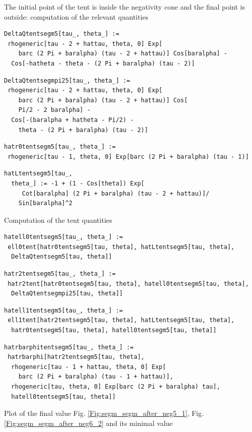 \documentclass[reqno]{amsart}
\theoremstyle{definition} \newtheorem{definition}{Definition}[section]
\theoremstyle{definition} \newtheorem{remark}[definition]{Remark}
\theoremstyle{plain} \newtheorem{lemma}[definition]{Lemma}
\theoremstyle{plain} \newtheorem{proposition}[definition]{Proposition}
\theoremstyle{plain} \newtheorem{theorem}[definition]{Theorem}
\theoremstyle{plain} \newtheorem{corollary}[definition]{Corollary}
\theoremstyle{definition} \newtheorem{example}[definition]{Example}
\theoremstyle{plain} \newtheorem{claim}[clai]{Claim}
\theoremstyle{definition} \newtheorem{assumption}[definition]{Assumption}
\theoremstyle{definition} \newtheorem{observation}[definition]{Observation}
\newcommand{\1}{\mathbbm 1}
\newcommand{\smed}{\medskip}
\numberwithin{equation}{section} %
\theoremstyle{plain} \newtheorem*{theorem*}{Theorem}
\theoremstyle{plain} \newtheorem{mthm}[maintheorem]{Main Theorem}
\theoremstyle{plain} \newtheorem*{mthm*}{Main Theorem}
\theoremstyle{plain} \newtheorem*{conjecture*}{Conjecture}
\theoremstyle{plain} \newtheorem{conjecture}[definition]{Conjecture}
\theoremstyle{plain} \newtheorem*{problem*}{Problem}
\begin{document}
\noindent The initial point of the tent is inside the negativity cone and the final point is outside: computation of the relevant quantities
\smed
\begin{verbatim}
DeltaQtentsegm5[tau_, theta_] := 
 rhogeneric[tau - 2 + hattau, theta, 0] Exp[
    barc (2 Pi + baralpha) (tau - 2 + hattau)] Cos[baralpha] - 
  Cos[-hatheta - theta - (2 Pi + baralpha) (tau - 2)]
\end{verbatim}
\begin{verbatim}
DeltaQtentsegmpi25[tau_, theta_] := 
 rhogeneric[tau - 2 + hattau, theta, 0] Exp[
    barc (2 Pi + baralpha) (tau - 2 + hattau)] Cos[
    Pi/2 - 2 baralpha] - 
  Cos[-(baralpha + hatheta - Pi/2) - 
    theta - (2 Pi + baralpha) (tau - 2)]
\end{verbatim}
\begin{verbatim}
hatr0tentsegm5[tau_, theta_] := 
 rhogeneric[tau - 1, theta, 0] Exp[barc (2 Pi + baralpha) (tau - 1)]
\end{verbatim}
\begin{verbatim}
hatLtentsegm5[tau_, 
  theta_] := -1 + (1 - Cos[theta]) Exp[
     Cot[baralpha] (2 Pi + baralpha) (tau - 2 + hattau)]/
    Sin[baralpha]^2
\end{verbatim}
\smed
Computation of the tent quantities
\smed
\begin{verbatim}
hatell0tentsegm5[tau_, theta_] := 
 ell0tent[hatr0tentsegm5[tau, theta], hatLtentsegm5[tau, theta], 
  DeltaQtentsegm5[tau, theta]]
\end{verbatim}
\begin{verbatim}
hatr2tentsegm5[tau_, theta_] := 
 hatr2tent[hatr0tentsegm5[tau, theta], hatell0tentsegm5[tau, theta], 
  DeltaQtentsegmpi25[tau, theta]]
\end{verbatim}
\begin{verbatim}
hatell1tentsegm5[tau_, theta_] := 
 ell1tent[hatr2tentsegm5[tau, theta], hatLtentsegm5[tau, theta], 
  hatr0tentsegm5[tau, theta], hatell0tentsegm5[tau, theta]]
\end{verbatim}
\begin{verbatim}
hatrbarphitentsegm5[tau_, theta_] := 
 hatrbarphi[hatr2tentsegm5[tau, theta], 
  rhogeneric[tau - 1 + hattau, theta, 0] Exp[
    barc (2 Pi + baralpha) (tau - 1 + hattau)], 
  rhogeneric[tau, theta, 0] Exp[barc (2 Pi + baralpha) tau], 
  hatell0tentsegm5[tau, theta]]
\end{verbatim}
\smed
Plot of the final value Fig. \ref{Fig:segm_segm_after_neg5_1}, Fig. \ref{Fig:segm_segm_after_neg6_2} and its minimal value
\smed
\end{document}
